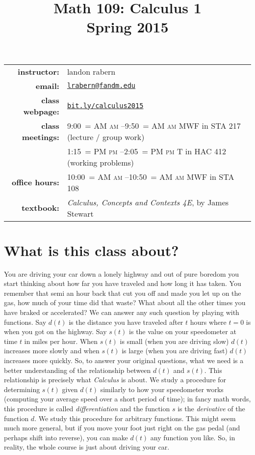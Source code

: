 \documentclass[12pt]{article}
\title{Math 109: Calculus 1\\ \bigskip\small{Spring 2015}}
\date{}
\makeatletter
\DeclareRobustCommand{\maybefakesc}[1]{%
  \ifnum\pdfstrcmp{\f@series}{\bfdefault}=\z@
    {\fontsize{\dimexpr0.8\dimexpr\f@size pt\relax}{0}\selectfont\uppercase{#1}}%
  \else
    \textsc{#1}%
  \fi
}
\newcommand\AM{\,\maybefakesc{am}\xspace}
\newcommand\PM{\,\maybefakesc{pm}\xspace}
\makeatother
\begin{document}
\maketitle

\begin{tabular}{r l}
\textbf{instructor:}& landon rabern\\
\textbf{email:}& \href{mailto:lrabern@fandm.edu}{\nolinkurl{lrabern@fandm.edu}}\\
\textbf{class webpage:}& \href{http://bit.ly/calculus2015}{\nolinkurl{bit.ly/calculus2015}}\\
\textbf{class meetings:}& 9:00\AM--9:50\AM MWF in STA 217 (lecture / group work)\\
& 1:15\PM--2:05\PM T in HAC 412 (working problems)\\
\textbf{office hours:}& 10:00\AM--10:50\AM MWF in STA 108\\
\textbf{textbook:}&\textit{Calculus, Concepts and Contexts 4E}, by James Stewart\\
\end{tabular}

\section*{What is this class about?}
You are driving your car down a lonely highway and out of pure boredom you start thinking about how far you have traveled and how long it has taken.  You remember
that semi an hour back that cut you off and made you let up on the gas, how much of your time did that waste?  What about all the other times you have braked or accelerated?
We can answer any such question by playing with functions.  Say $d(t)$ is the distance you have traveled after $t$ hours where $t = 0$ is when you got on the highway.   Say $s(t)$ is the value on your speedometer at time $t$ in miles per hour.  When $s(t)$ is small (when you are driving slow) $d(t)$ increases more slowly and when $s(t)$ is large (when you are driving fast) $d(t)$ increases more quickly.  So, to answer your original questions, what we need is a better understanding of the relationship between $d(t)$ and $s(t)$. This relationship is precisely what \emph{Calculus} is about. We study a procedure for determining $s(t)$ given $d(t)$ similarly to how your speedometer works (computing your average speed over a short period of time); in fancy math words, this procedure is called \emph{differentiation} and the function $s$ is the \emph{derivative} of the function $d$. We study this procedure for arbitrary functions. This might seem much more general, but if you move your foot just right on the gas pedal (and perhaps shift into reverse), you can make $d(t)$ any function you like.  So, in reality, the whole course is just about driving your car.
\end{document}
